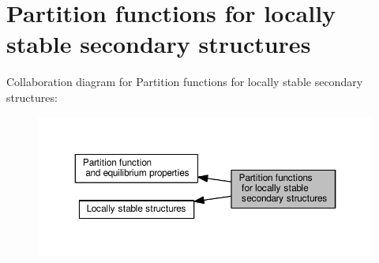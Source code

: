 \hypertarget{group__local__pf__fold}{}\section{Partition functions for locally stable secondary structures}
\label{group__local__pf__fold}
Collaboration diagram for Partition functions for locally stable secondary structures\+:
\nopagebreak
\begin{figure}[H]
\begin{center}
\leavevmode
\includegraphics[width=350pt]{group__local__pf__fold}
\end{center}
\end{figure}
